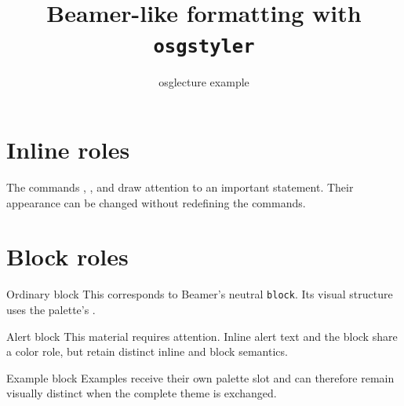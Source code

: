 \documentclass{article}
\title{Beamer-like formatting with \texttt{osgstyler}}
\author{osglecture example}
\date{}
\begin{document}
\maketitle

\section{Inline roles}

The commands , , and \alert{draw attention to an important
statement}. Their appearance can be changed without redefining the commands.

\section{Block roles}

\begin{block}{Ordinary block}
  This corresponds to Beamer's neutral \texttt{block}. Its visual structure
  uses the palette's .
\end{block}

\begin{alertblock}{Alert block}
  This material requires attention. Inline \alert{alert text} and the block
  share a color role, but retain distinct inline and block semantics.
\end{alertblock}

\begin{exampleblock}{Example block}
  Examples receive their own palette slot and can therefore remain visually
  distinct when the complete theme is exchanged.
\end{exampleblock}
\end{document}
